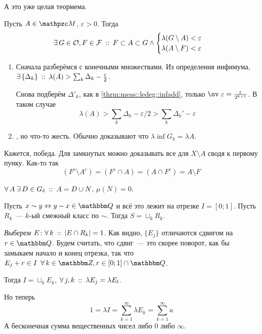 \documentclass[draft, timbord]{longnotes}
\begin{document}
А это уже целая теормема.
\begin{thrm}\label{thrm:meas::ledeg::reg}
  Пусть $A \in \lebesgue$, $\varepsilon > 0$. Тогда 
  \[
    \exists\, G \in \mathcal O, F \in \mathcal F \:::\: F \subset A \subset G \land 
    \begin{cases}
      \lambda(G \setminus A) < \varepsilon \\
      \lambda(A \setminus F) < \varepsilon 
    \end{cases}
  \]
\end{thrm}
\begin{tproof}
  \begin{enumerate}[(1)]
    \item Сначала разберёмся с конечными множествами. Из определения инфимума, 
      $\exists\, \{\Delta_k\} \:::\: \lambda(A) > \sum_k \Delta_k - \frac{\varepsilon}{2} $.

      Снова подберём $\Delta'_k$, как в \ref{thrm:meas::ledeg::infadd},
      только $\ov~\varepsilon = \frac{\varepsilon}{2^{k+1}}$.
      В таком случае \[
        \lambda(A) > \sum_k \Delta_k - \varepsilon / 2 > \sum_k \Delta_k ' - \varepsilon
      \]
    \item \underdev, но что-то жесть. Обычно доказывают что  $\lambda \inf G_k = \lambda A$.
  \end{enumerate}
  Кажется, победа. Для замкнутых можно доказывать все для $X \setminus A$ сводя к первому
  пунку. Как-то так\[
    (F^c \setminus A^c) = (F^c \cap A) = (A \cap F^c) = A \setminus F
  \]
\end{tproof}
\begin{cor}\label{cor:meas::ledeg::gdelta}
  $\forall\, A \; \exists\, D \in G_\delta \:::\: A = D \cup N$, $\mu(N) = 0$.
\end{cor}

\begin{exmp}\label{exmp:meas::ledeg::unmeasbl}
  Пусть $x \sim y \Leftrightarrow y-x \in \Q$ и всё это лежит на отрезке $I=[0;1]$.
  Пусть $R_k$~--- $k$-ый смежный класс по $\sim$. Тогда $S = \sqcup_k R_k$.
  
  \emph{Выберем} $E \colon \forall\, k \:::\: | E \cap R_k| = 1$. Как видно, $\{E_j\}$ отличаются
  сдвигом на $r \in \Q$. Будем считать, что сдвиг~--- это скорее поворот, как бы замыкаем
  начало и конец отрезка, так что $E_j + r \in I \;\: \forall\, k\in \Z, r\in[0;1]\cap \Q$.

  Тогда $I = \sqcup_k E_k$, $\forall\, j,k \:::\:\lambda E_j = \lambda E_l $.
  
  Но теперь
  \[
    1= \lambda I = \sum_{k=1}^\infty \lambda E_k = \sum_{k=1}^\infty a 
  \]
  А бесконечная сумма вещественных чисел либо $0$ либо $\infty$.
\end{exmp}
\end{document}
